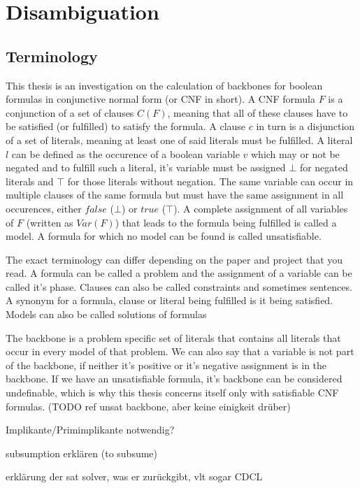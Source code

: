 \section{Disambiguation}
\subsection{Terminology}
This thesis is an investigation on the calculation of backbones for boolean formulas in conjunctive normal form (or CNF in short). A CNF formula $F$ is a conjunction of a set of clauses $C(F)$, meaning that all of these clauses have to be satisfied (or fulfilled) to satisfy the formula. A clause $c$ in turn is a disjunction of a set of literals, meaning at least one of said literals must be fulfilled. A literal $l$ can be defined as the occurence of a boolean variable $v$ which may or not be negated and to fulfill such a literal, it's variable must be assigned $\bot$ for negated literals and $\top$ for those literals without negation. The same variable can occur in multiple clauses of the same formula but must have the same assignment in all occurences, either $false$ ($\bot$) or $true$ ($\top$). A complete assignment of all variables of $F$ (written as $Var(F)$) that leads to the formula being fulfilled is called a model. A formula for which no model can be found is called unsatisfiable.



The exact terminology can differ depending on the paper and project that you read. A formula can be called a problem and the assignment of a variable can be called it's phase. Clauses can also be called constraints and sometimes sentences. A synonym for a formula, clause or literal being fulfilled is it being satisfied. Models can also be called solutions of formulas 



The backbone is a problem specific set of literals that contains all literals that occur in every model of that problem. We can also say that a variable is not part of the backbone, if neither it's positive or it's negative assignment is in the backbone. If we have an unsatisfiable formula, it's backbone can be considered undefinable, which is why this thesis concerns itself only with satisfiable CNF formulas. (TODO ref unsat backbone, aber keine einigkeit drüber)

Implikante/Primimplikante notwendig?

subsumption erklären (to subsume)

erklärung der sat solver, was er zurückgibt, vlt sogar CDCL